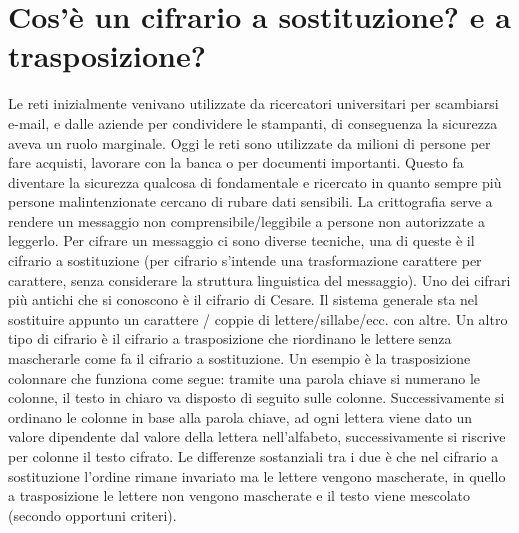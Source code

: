 \section{Cos’è un cifrario a sostituzione? e a trasposizione?}

Le reti inizialmente venivano utilizzate da ricercatori universitari per scambiarsi e-mail, e dalle aziende per condividere le stampanti, di conseguenza la sicurezza aveva un ruolo marginale.
Oggi le reti sono utilizzate da milioni di persone per fare acquisti, lavorare con la banca o per documenti importanti. Questo fa diventare la sicurezza qualcosa di fondamentale e ricercato in quanto sempre più persone malintenzionate cercano di rubare dati sensibili.
La crittografia serve a rendere un messaggio non comprensibile/leggibile a persone non autorizzate a leggerlo.
Per cifrare un messaggio ci sono diverse tecniche, una di queste è il cifrario a sostituzione (per cifrario s’intende una trasformazione carattere per carattere, senza considerare la struttura linguistica del messaggio). Uno dei cifrari più antichi che si conoscono è il cifrario di Cesare.
Il sistema generale sta nel sostituire appunto un carattere / coppie di lettere/sillabe/ecc. con altre.
Un altro tipo di cifrario è il cifrario a trasposizione che riordinano le lettere senza mascherarle come fa il cifrario a sostituzione.
Un esempio è la trasposizione colonnare che funziona come segue: tramite una parola chiave si numerano le colonne, il testo in chiaro va disposto di seguito sulle colonne. Successivamente si ordinano le colonne in base alla parola chiave, ad ogni lettera viene dato un valore dipendente dal valore della lettera nell’alfabeto, successivamente si riscrive per colonne il testo cifrato.
Le differenze sostanziali tra i due è che nel cifrario a sostituzione l’ordine rimane invariato ma le lettere vengono mascherate, in quello a trasposizione le lettere non vengono mascherate e il testo viene mescolato (secondo opportuni criteri).
